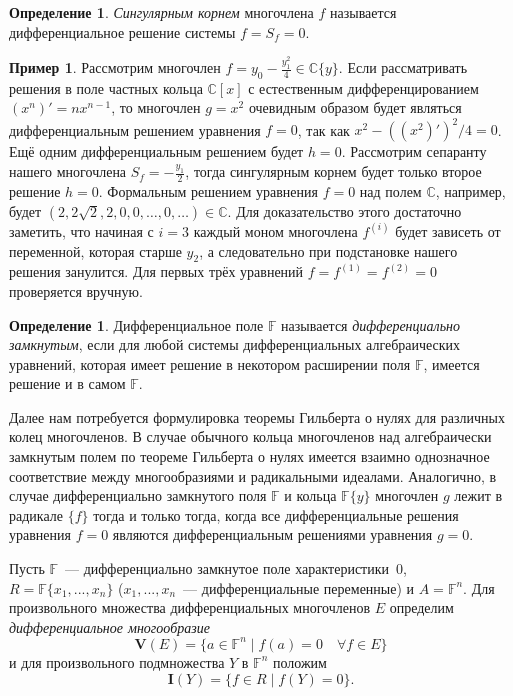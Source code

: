 \documentclass[16pt]{article}
\theoremstyle{plain1}
\theoremstyle{plain2}
\theoremstyle{plain}
\theoremstyle{plain3}
\theoremstyle{definition}
\newtheorem{definition}[theorem2]{Определение}
\newtheorem*{example*}{Пример}
\theoremstyle{remark}
\begin{document}
\begin{definition} \emph{Сингулярным корнем} многочлена $f$
называется дифференциальное решение системы $f=S_f=0$.
\end{definition}
\begin{example*}
Рассмотрим многочлен $f=y_0-\frac{y^2_1}{4}\in\mathbb{C}\{y\}$. Если рассматривать решения в поле частных кольца $\mathbb{C}[x]$ с естественным дифференцированием $(x^n)'=nx^{n-1}$, то многочлен $g=x^2$ очевидным образом будет являться  дифференциальным решением уравнения $f=0$, так как $x^2-((x^2)')^2/4=0$. Ещё одним дифференциальным решением будет $h=0$. Рассмотрим сепаранту нашего многочлена $S_f=-\frac{y_1}{2}$, тогда сингулярным корнем будет только второе решение $h=0$. Формальным решением уравнения $f=0$ над полем $\mathbb{C}$, например, будет $(2,2\sqrt{2},2,0,0,\ldots,0,\ldots)\in \mathbb{C}$. Для доказательство этого достаточно заметить, что начиная с $i=3$ каждый моном  многочлена $f^{(i)}$ будет зависеть от переменной, которая старше $y_2$, а следовательно при подстановке нашего решения занулится. Для первых трёх уравнений $f=f^{(1)}=f^{(2)}=0$ проверяется вручную.
\end{example*}
\begin{definition} Дифференциальное поле $\mathbb{F}$ называется
\emph{дифференциально замкнутым}, если для любой системы дифференциальных алгебраических
уравнений, которая имеет решение в некотором расширении поля $\mathbb{F}$,
имеется решение и в самом $\mathbb{F}$.
\end{definition}

Далее нам потребуется формулировка теоремы Гильберта о нулях для
различных колец многочленов.
В случае обычного кольца многочленов над алгебраически
замкнутым полем по теореме Гильберта о нулях
имеется взаимно однозначное соответствие между многообразиями и радикальными идеалами.
Аналогично, в случае дифференциально
замкнутого поля $\mathbb{F}$ и кольца $\mathbb{F}\{y\}$ многочлен $g$ лежит в
радикале $\{f\}$ тогда и только тогда, когда все дифференциальные
решения уравнения $f=0$ являются дифференциальным решениями уравнения $g=0$.

Пусть $\mathbb{F}$~--- дифференциально замкнутое поле характеристики~$0$,
$R=\mathbb{F}\{x_1,...,x_n\}$ ($x_1,...,x_n$~--- дифференциальные
переменные) и $A=\mathbb{F}^n$. Для произвольного множества
дифференциальных многочленов $E$ определим \emph{дифференциальное многообразие}
$$
\mathbf{V}(E)=\{a\in \mathbb{F}^n \mid f(a)=0\quad\forall  f\in E\}
$$
и для произвольного подмножества $Y$ в $\mathbb{F}^n$ положим
$$
\mathbf{I}(Y)=\{f \in R \mid f(Y)=0\}.
$$
\end{document}
